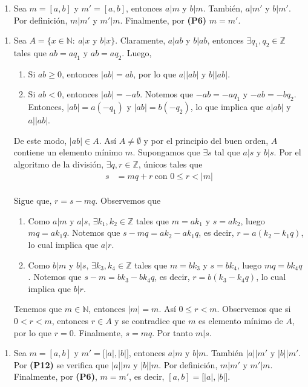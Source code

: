 \documentclass[11pt]{article}
\newcommand{\N}{\mathbb{N}}
\newcommand{\Z}{\mathbb{Z}}
\begin{document}
\begin{enumerate}[label=33.1]
  \item Sea $m=[a,b]$ y $m'=[a,b]$, entonces $a|m$ y $b|m$. También, $a|m'$ y $b|m'$. Por definición, $m|m'$ y $m'|m$. Finalmente, por \textbf{(P6)} $m=m'$.
\end{enumerate}

\begin{enumerate}[label=33.2]
  \item Sea $A=\{x\in \N: \ a|x$ y $b|x\}$. Claramente, $a|ab$ y $b|ab$, entonces $\exists q_1, q_2\in \Z$ tales que $ab=aq_1$ y $ab=aq_2$. Luego,
    \begin{enumerate}[label=\roman*)]
      \item Si $ab \geq 0$, entonces $|ab|=ab$, por lo que $a \big| |ab|$ y $b \big| |ab|$.
      \item Si $ab <0$, entonces $|ab|=-ab$. Notemos que $-ab=-aq_1$ y $-ab=-bq_2$. Entonces, $|ab|=a(-q_1)$ y $|ab|=b(-q_2)$, lo que implica que $a \big |ab|$ y $a \big| |ab|$.
    \end{enumerate}
    De este modo, $|ab|\in A$. Así $A \neq \emptyset$ y por el principio del buen orden, $A$ contiene un elemento mínimo $m$. Supongamos que $\exists s$ tal que $a|s$ y $b|s$. Por el algoritmo de la división, $\exists q,r\in\Z$, únicos tales que
      \begin{align*}
        s &= mq+r \ \text{con $0 \leq r < |m|$}
      \end{align*}
      \\Sigue que, $r=s-mq$. Observemos que
      \begin{enumerate}[label=\roman*)]
        \item Como $a|m$ y $a|s$, $\exists k_1,k_2\in \Z$ tales que $m=ak_1$ y $s=ak_2$, luego $mq=ak_1q$. Notemos que $s-mq=ak_2-ak_1q$, es decir, $r=a(k_2-k_1q)$, lo cual implica que $a|r$.
        \item Como $b|m$ y $b|s$, $\exists k_3,k_4 \in \Z$ tales que $m=bk_3$ y $s=bk_4$, luego $mq=bk_4q$. Notemos que $s-m=bk_3-bk_4q$, es decir, $r=b(k_3-k_4q)$, lo cual implica que $b|r$.
      \end{enumerate}
      Tenemos que $m\in \N$, entonces $|m|=m$. Así $0 \leq r<m$. Observemos que si $0<r<m$, entonces $r\in A$ y se contradice que $m$ es elemento mínimo de $A$, por lo que $r=0$. Finalmente, $s=mq$. Por tanto $m|s$.
\end{enumerate}

\begin{enumerate}[label=33.3]
  \item Sea $m=[a,b]$ y $m'=\big[|a|,|b| \big]$, entonces $a|m$ y $b|m$. También $|a| \big| m'$ y $|b| \big| m'$. Por \textbf{(P12)} se verifica que $|a| \big| m$ y $|b| \big| m$. Por definición, $m|m'$ y $m'|m$. Finalmente, por \textbf{(P6)}, $m=m'$, es decir, $[a,b]=\big[|a|,|b| \big]$.
\end{enumerate}
\end{document}
